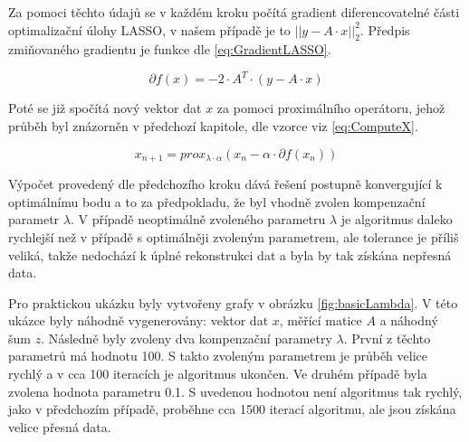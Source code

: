 \documentclass[FM,BP]{tulthesis}
\newcounter{Vzorce}
\begin{document}
Za pomoci těchto údajů se v každém kroku počítá gradient diferencovatelné části optimalizační úlohy LASSO, v našem případě je to $\left|\right|y-A \cdot x\left|\right|_{2}^{2}$. Předpis zmiňovaného gradientu je funkce dle \ref{eq:GradientLASSO}.

\begin{equation} \label{eq:GradientLASSO}  \tag{Vzorec \theVzorce}
\partial f(x) = -2 \cdot A^T \cdot (y-A \cdot x)
\end{equation}

Poté se již spočítá nový vektor dat $x$ za pomoci proximálního operátoru, jehož průběh byl znázorněn v předchozí kapitole, dle vzorce viz \ref{eq:ComputeX}. 

\begin{equation} \label{eq:ComputeX}  \tag{Vzorec \theVzorce}
x_{n+1} = prox_{\lambda \cdot \alpha}(x_{n}- \alpha \cdot \partial f(x_{n}))
\end{equation}

Výpočet provedený dle předchozího kroku dává řešení postupně konvergující k optimálnímu bodu a to za předpokladu, že byl vhodně zvolen kompenzační parametr $\lambda$. V případě neoptimálně zvoleného parametru $\lambda$ je algoritmus daleko rychlejší než v případě s optimálněji zvoleným parametrem, ale tolerance je příliš veliká, takže nedochází k úplné rekonstrukci dat a byla by tak získána nepřesná data.

Pro praktickou ukázku byly vytvořeny grafy v obrázku \ref{fig:basicLambda}. V této ukázce byly náhodně vygenerovány: vektor dat $x$, měřící matice $A$ a náhodný šum $z$. Následně byly zvoleny dva kompenzační parametry $\lambda$. První z těchto parametrů má hodnotu 100. S takto zvoleným parametrem je průběh velice rychlý a v cca 100 iteracích je algoritmus ukončen. Ve druhém případě byla zvolena hodnota parametru 0.1. S uvedenou hodnotou není algoritmus tak rychlý, jako v předchozím případě, proběhne cca 1500 iterací algoritmu, ale jsou získána velice přesná data.
\end{document}
